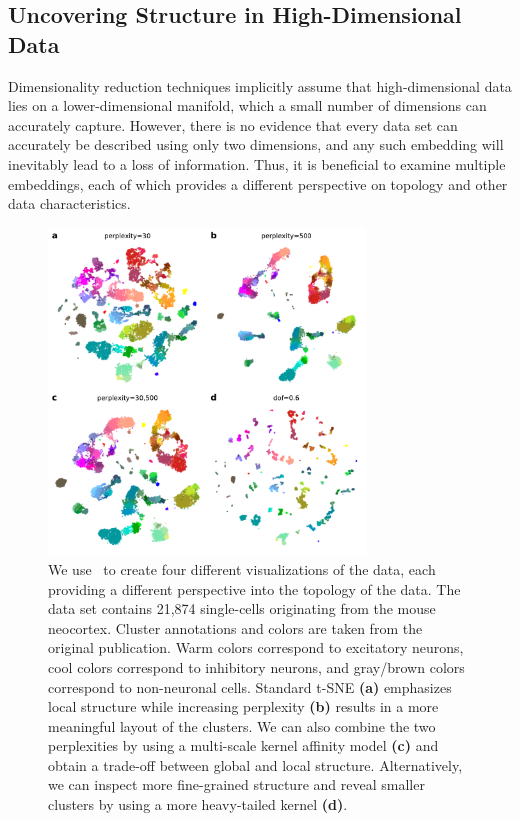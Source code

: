 \documentclass[article]{jss}
\newcommand{\opentsne}{\pkg{openTSNE}}
\begin{document}
\subsection{Uncovering Structure in High-Dimensional Data}

Dimensionality reduction techniques implicitly assume that high-dimensional data lies on a lower-dimensional manifold, which a small number of dimensions can accurately capture. However, there is no evidence that every data set can accurately be described using only two dimensions, and any such embedding will inevitably lead to a loss of information. Thus, it is beneficial to examine multiple embeddings, each of which provides a different perspective on topology and other data characteristics.

\begin{figure}[htbp]
  \center
  \includegraphics[width=0.75\textwidth]{tasic2018}
  \caption{\label{fig:tasic}
  We use \opentsne\ to create four different
  visualizations of the \citet{tasic2018shared} data,
  each providing a different perspective into the topology of the data.
  The data set contains 21,874 single-cells originating from the mouse
  neocortex. Cluster annotations and colors are taken from the original
  publication. Warm colors correspond to excitatory neurons, cool colors
  correspond to inhibitory neurons, and gray/brown colors correspond to
  non-neuronal cells. Standard t-SNE \textbf{(a)} emphasizes local
  structure while increasing perplexity \textbf{(b)} results in a more
  meaningful layout of the clusters. We can also combine the two
  perplexities by using a multi-scale kernel affinity model \textbf{(c)}
  and obtain a trade-off between global and local structure.
  Alternatively, we can inspect more fine-grained structure and reveal
  smaller clusters by using a more heavy-tailed kernel \textbf{(d)}.}
\end{figure}
\end{document}
